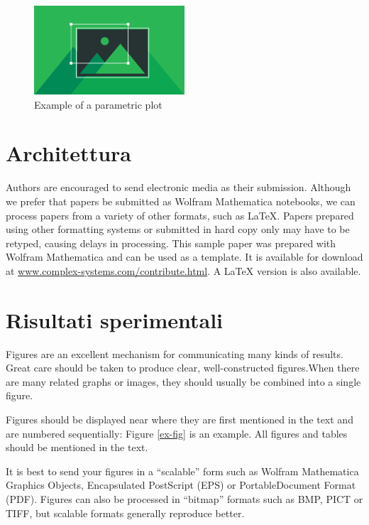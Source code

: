 \documentclass{article}
\begin{document}
\begin{figure}[h]
\centering
\includegraphics[width=0.5\textwidth]{introduzioneimg1.png}
\caption{Example of a parametric plot}
\end{figure}
\break

\section{Architettura}

Authors are encouraged to send electronic media as their submission. Although we prefer that papers be submitted as Wolfram Mathematica notebooks, we can process papers from a variety of other formats, such as LaTeX. Papers prepared using other formatting systems or submitted in hard copy only may have to be retyped, causing delays in processing. This sample paper was prepared with Wolfram Mathematica and can be used as a template. It is available for download at \url{www.complex-systems.com/contribute.html}. A LaTeX version is also available.

\section{Risultati sperimentali}

Figures are an excellent mechanism for communicating many kinds of results. Great care should be taken to produce clear, well-constructed figures.When there are many related graphs or images, they should usually be combined into a single figure. 

Figures should be displayed near where they are first mentioned in the text and are numbered sequentially: Figure \ref{ex-fig} is an example. All figures and tables should be mentioned in the text.

It is best to send your figures in a {``}scalable{''} form such as Wolfram Mathematica Graphics Objects, Encapsulated PostScript (EPS) or PortableDocument Format (PDF). Figures can also be processed in {``}bitmap{''} formats such as BMP, PICT or TIFF, but scalable formats generally reproduce better.
 
\end{document}

